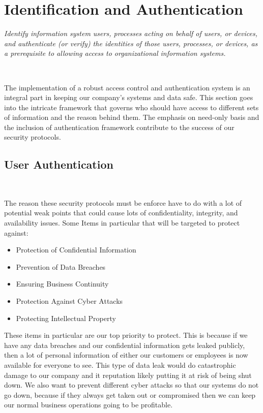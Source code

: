 \documentclass[12pt,a4paper]{report}
\begin{document}
\chapter{Identification and Authentication}
\textit{Identify information system users, processes acting on behalf of users, or devices, and authenticate (or verify) the identities of those users, processes, or devices, as a prerequisite to allowing access to organizational information systems.}

\

The implementation of a robust access control and authentication system is an integral part in keeping our company's systems and data safe.
This section goes into the intricate framework that governs who should have access to different sets of information and the reason behind them.
The emphasis on need-only basis and the inclusion of authentication framework contribute to the success of our security protocols. 

\section{User Authentication}
\

The reason these security protocols must be enforce have to do with a lot of potential weak points that could cause lots of confidentiality, integrity, and availability issues.
Some Items in particular that will be targeted to protect against:
\begin{itemize}
 \item Protection of Confidential Information
 \item Prevention of Data Breaches
 \item Ensuring Business Continuity
 \item Protection Against Cyber Attacks
 \item Protecting Intellectual Property
\end{itemize}

These items in particular are our top priority to protect.
This is because if we have any data breaches and our confidential information gets leaked publicly, then a lot of personal information of either our customers or employees is now available for everyone to see.
This type of data leak would do catastrophic damage to our company and it reputation likely putting it at risk of being shut down.
We also want to prevent different cyber attacks so that our systems do not go down, because if they always get taken out or compromised then we can keep our normal business operations going to be profitable.
\end{document}
